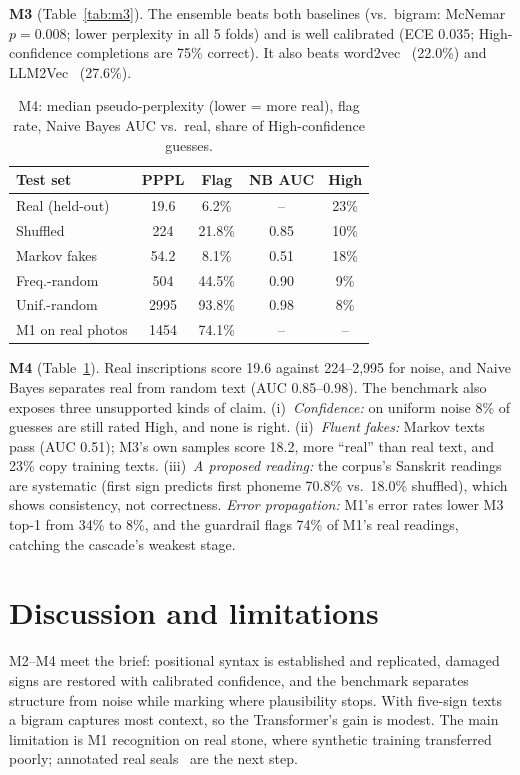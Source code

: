 \documentclass[11pt,a4paper,twocolumn]{article}
\begin{document}
\textbf{M3} (Table~\ref{tab:m3}). The ensemble beats both baselines (vs.\ bigram: McNemar $p=0.008$;
lower perplexity in all 5 folds) and is well calibrated (ECE 0.035; High-confidence completions are 75\% correct). It also beats word2vec~\cite{mikolov2013} (22.0\%) and LLM2Vec~\cite{llm2vec2024} (27.6\%).

\begin{table}[h]
\centering
\small
\setlength{\tabcolsep}{3.5pt}
\begin{tabular}{lcccc}
\toprule
Test set & PPPL & Flag & NB AUC & High \\
\midrule
Real (held-out) & 19.6 & 6.2\% & -- & 23\% \\
Shuffled & 224 & 21.8\% & 0.85 & 10\% \\
Markov fakes & 54.2 & 8.1\% & 0.51 & 18\% \\
Freq.-random & 504 & 44.5\% & 0.90 & 9\% \\
Unif.-random & 2995 & 93.8\% & 0.98 & 8\% \\
M1 on real photos & 1454 & 74.1\% & -- & -- \\
\bottomrule
\end{tabular}
\caption{M4: median pseudo-perplexity (lower = more real), flag rate, Naive Bayes AUC vs.\ real, share
of High-confidence guesses.}
\label{tab:m4}
\end{table}

\textbf{M4} (Table~\ref{tab:m4}). Real inscriptions score 19.6 against 224--2,995 for noise, and Naive
Bayes separates real from random text (AUC 0.85--0.98). The benchmark also exposes three unsupported
kinds of claim. (i)~\emph{Confidence:} on uniform noise 8\% of guesses are still rated High,
and none is right. (ii)~\emph{Fluent fakes:} Markov texts pass (AUC 0.51); M3's own samples score 18.2, more
``real'' than real text, and 23\% copy training texts. (iii)~\emph{A
proposed reading:} the corpus's Sanskrit readings are systematic (first sign predicts first phoneme
70.8\% vs.\ 18.0\% shuffled), which shows consistency, not correctness.
\emph{Error propagation:} M1's error rates lower M3 top-1 from 34\% to 8\%, and the guardrail
flags 74\% of M1's real readings, catching the cascade's weakest stage.

\section{Discussion and limitations}
M2--M4 meet the brief: positional syntax is established and replicated, damaged signs are restored with
calibrated confidence, and the benchmark separates structure from noise while marking where plausibility
stops. With five-sign texts a bigram captures most context, so the Transformer's gain is modest.
The main limitation is M1 recognition on real stone, where synthetic training transferred poorly;
annotated real seals~\cite{dixit2025} are the next step.
\end{document}
